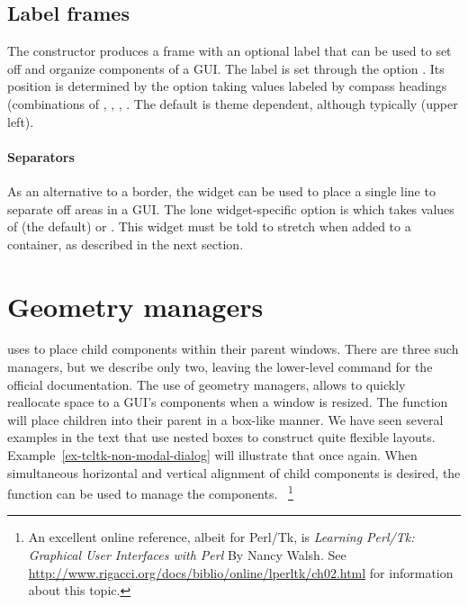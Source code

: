 \subsection{Label frames}
\label{sec:tcltk:label-frames}

The  constructor produces a frame with an
optional label that can be used to set off and organize components of
a GUI. The label is set through the option
. Its position is determined by the option
 taking values labeled by compass
headings (combinations of , , , . The
default is theme dependent, although typically  (upper
left).

\paragraph{Separators}
As an alternative to a border, the  widget can be used
to place a single line to separate off areas in a GUI. The lone
widget-specific option is  which takes
values of  (the default) or . This
widget must be told to stretch when added to a container, as described
in the next section.

\section{Geometry managers}
\label{sec:tcltk:geometry-managers}

\TCL\/ uses  to place child
components within their parent windows. There are three such managers,
but we describe only two, leaving the lower-level  command
for the official documentation. The use of geometry managers, allows
\TK\/ to quickly reallocate space to a GUI's components when a window
is resized.  The  function will place children into
their parent in a box-like manner. We have seen several examples in
the text that use nested boxes to construct quite flexible layouts.
Example~\ref{ex-tcltk-non-modal-dialog} will illustrate that once
again. When simultaneous horizontal and vertical alignment of child
components is desired, the  function can be used to
manage the components. ~\footnote{An excellent online reference,
  albeit for Perl/Tk, is \textit{Learning Perl/Tk: Graphical User
    Interfaces with Perl} By Nancy Walsh. See
  \url{http://www.rigacci.org/docs/biblio/online/lperltk/ch02.html}
  for information about this topic.}
\\

